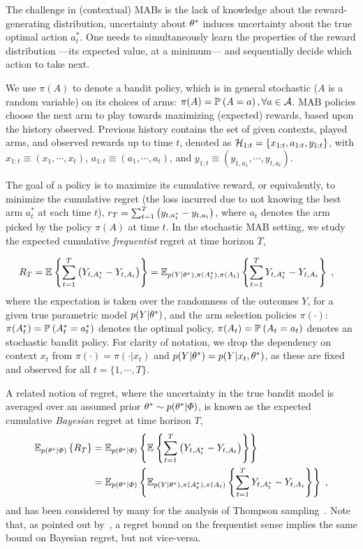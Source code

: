 The challenge in (contextual) MABs is the lack of knowledge about the reward-generating distribution, \ie uncertainty about $\theta^*$ induces uncertainty about the true optimal action $a_t^*$. One needs to simultaneously learn the properties of the reward distribution ---its expected value, at a minimum--- and sequentially decide which action to take next.

We use $\pi(A)$ to denote a bandit policy, which is in general stochastic (\ie $A$ is a random variable) on its choices of arms: $\pi(A)=\mathbb{P}_{}\left( A=a \right), \forall a\in\mathcal{A}$.
MAB policies choose the next arm to play towards maximizing (expected) rewards, based upon the history observed. Previous history contains the set of given contexts, played arms, and observed rewards up to time $t$, denoted as $\mathcal{H}_{1:t}=\left\{x_{1:t}, a_{1:t}, y_{1:t}\right\}$, with $x_{1:t} \equiv (x_1, \cdots , x_t)$, $a_{1:t} \equiv (a_1, \cdots , a_t)$, and $y_{1:t} \equiv (y_{1,a_1}, \cdots , y_{t,a_t})$.

The goal of a policy is to maximize its cumulative reward, or equivalently, to minimize the cumulative regret (the loss incurred due to not knowing the best arm $a_t^*$ at each time $t$), \ie $r_T=\sum_{t=1}^T \left(y_{t,a^*_t}-y_{t,a_t}\right)$, where $a_t$ denotes the arm picked by the policy $\pi(A)$ at time $t$.
In the stochastic MAB setting, we study the expected cumulative \emph{frequentist} regret at time horizon $T$,

\begin{align}
R_T &=\mathbb{E}_{}\left\{ \sum_{t=1}^T \left(Y_{t,A^*_t}-Y_{t,A_t} \right) \right\} =\mathbb{E}_{p(Y|\theta^*), \pi(A^*_t), \pi(A_t)}\left\{   \sum_{t=1}^T Y_{t,A^*_t}-Y_{t,A_t} \right\} \; ,
\label{eq:cumulative_regret}
\end{align}
where the expectation is taken over the randomness of the outcomes $Y$, for a given true parametric model $p(Y|\theta^*)$, and the arm selection policies $\pi(\cdot)$: $\pi(A^*_t)=\mathbb{P}_{}\left( A^*_t=a^*_t \right)$ denotes the optimal policy, $\pi(A_t)=\mathbb{P}_{}\left( A_t=a_t \right)$ denotes an stochastic bandit policy.
For clarity of notation, we drop the dependency on context $x_t$ from $\pi(\cdot)=\pi(\cdot|x_t)$ and $p(Y|\theta^*)=p(Y|x_t, \theta^*)$, as these are fixed and observed for all $t =\{1,\cdots, T\}$.

A related notion of regret, where the uncertainty in the true bandit model is averaged over an assumed prior $\theta^* \sim p(\theta^*|\varPhi)$, is known as
the expected cumulative \emph{Bayesian} regret at time horizon $T$,
\begin{align}
\mathbb{E}_{p(\theta^*|\varPhi)}\left\{ R_T \right\}&=\mathbb{E}_{p(\theta^*|\varPhi)}\left\{ \mathbb{E}_{}\left\{ \sum_{t=1}^T \left(Y_{t,A^*_t}-Y_{t,A_t} \right) \right\} \right\} \nonumber \\
&=\mathbb{E}_{p(\theta^*|\varPhi)}\left\{ 
	\mathbb{E}_{p(Y|\theta^*), \pi(A^*_t), \pi(A_t)}\left\{   \sum_{t=1}^T Y_{t,A^*_t}-Y_{t,A_t} \right\}
 \right\} \; ,
\label{eq:cumulative_regret_bayes}
\end{align}
and has been considered by many for the analysis of Thompson sampling~\citep{ic-Bubeck2013,j-Russo2014,j-Russo2016}. Note that, as pointed out by~\citep{ip-Agrawal2013}, a regret bound on the frequentist sense implies the same bound on Bayesian regret, but not vice-versa.

